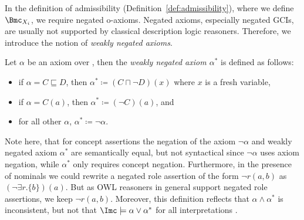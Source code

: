 In the definition of admissibility (Definition~\ref{def:admissibility}), where we define $\Bmc_{X_{i}}$,
we require negated o-axioms. Negated axioms, especially negated GCIs, are usually not supported by
classical description logic reasoners. Therefore, we introduce the notion of \emph{weakly negated
  axioms}.

\begin{definition}
  Let $\alpha$ be an axiom over \Nsig, then the \emph{weakly negated axiom $\alpha^{*}$} is defined
  as follows:
  \begin{itemize}
  \item if $\alpha = C \sqsubseteq D$, then $\alpha^{*} \coloneqq (C \sqcap \lnot D)(x)$ where $x$
    is a fresh variable,
  \item if $\alpha = C(a)$, then $\alpha^{*} \coloneqq (\lnot C)(a)$, and
  \item for all other $\alpha$, $\alpha^{*} \coloneqq \lnot \alpha$. \qedhere
  \end{itemize}
\end{definition}

Note here, that for concept assertions the negation of the axiom $\lnot\alpha$ and weakly negated
axiom $\alpha^{*}$ are semantically equal, but not syntactical since $\lnot\alpha$ uses axiom
negation, while $\alpha^{*}$ only requires concept negation. Furthermore, in the presence of
nominals we could rewrite a negated role assertion of the form $\lnot r(a,b)$ as
$(\lnot\exists r.\{b\})(a)$. But as OWL reasoners in general support negated role assertions, we
keep $\lnot r(a,b)$.  Moreover, this definition reflects that $\alpha\land\alpha^{*}$ is
inconsistent, but not that $\I\models\alpha\lor\alpha^{*}$ for all interpretations \I.

